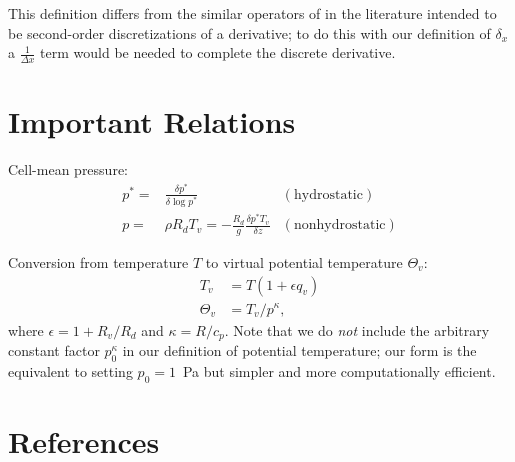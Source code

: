 \documentclass[12pt,letterpaper]{book}
\begin{document}
This definition differs from the similar operators of in the literature intended to be second-order discretizations of a derivative; to do this with our definition of $\delta_x$ a $\frac{1}{\Delta x}$ term would be needed to complete the discrete derivative.

\section{Important Relations}

Cell-mean pressure:
\begin{align}
p^* =&  \frac{\delta p^*}{\delta \log p^*} \; &\mathrm{(hydrostatic)} \\
p = & \rho R_d T_v = - \frac{R_d}{g} \frac{\delta p^* T_v}{\delta z}  &\mathrm{(nonhydrostatic)} 
\end{align}

Conversion from temperature $T$ to virtual potential temperature $\Theta_v$:
\begin{align}
T_v &= T \left ( 1 + \epsilon q_v \right )  \\
\Theta_v & = T_v / p^\kappa,
\end{align}
where $\epsilon = 1 + R_v/R_d$ and $\kappa = R/c_p$. Note that we do \textit{not} include the arbitrary constant factor $p_0^\kappa$ in our definition of potential temperature; our form is the equivalent to setting $p_0 = 1$~Pa but simpler and more computationally efficient.

\section{References}
\end{document}
